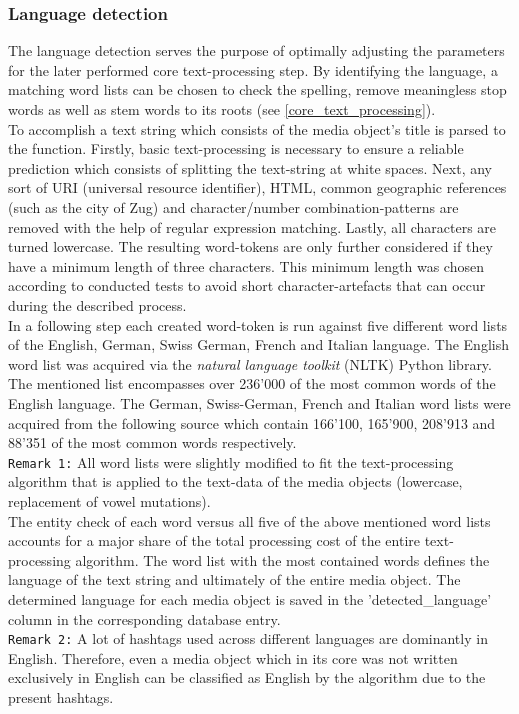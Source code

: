 \subsubsection*{Language detection} \label{language_detection}
The language detection serves the purpose of optimally adjusting the parameters for the later performed core text-processing step. By identifying the language, a matching word lists can be chosen to check the spelling, remove meaningless stop words as well as stem words to its roots (see \ref{core_text_processing}).\\
To accomplish a text string which consists of the media object's title is parsed to the function. Firstly, basic text-processing is necessary to ensure a reliable prediction which consists of splitting the text-string at white spaces. Next, any sort of URI (universal resource identifier), HTML, common geographic references (such as the city of Zug) and character/number combination-patterns are removed with the help of regular expression matching. Lastly, all characters are turned lowercase. The resulting word-tokens are only further considered if they have a minimum length of three characters. This minimum length was chosen according to conducted tests to avoid short character-artefacts that can occur during the described process.\\
In a following step each created word-token is run against five different word lists of the English, German, Swiss German, French and Italian language.
The English word list was acquired via the \textit{natural language toolkit} (NLTK) Python library. The mentioned list encompasses over 236'000 of the most common words of the English language.
The German, Swiss-German, French and Italian word lists were acquired from the following source \parencite{Geooffwicks} which contain 166'100, 165'900, 208'913 and 88'351 of the most common words respectively.\\
\newline
\texttt{Remark 1:} All word lists were slightly modified to fit the text-processing algorithm that is applied to the text-data of the media objects (lowercase, replacement of vowel mutations).\\
\newline
The entity check of each word versus all five of the above mentioned word lists accounts for a major share of the total processing cost of the entire text-processing algorithm. The word list with the most contained words defines the language of the text string and ultimately of the entire media object. The determined language for each media object is saved in the 'detected\_language' column in the corresponding database entry.\\
\newline
\texttt{Remark 2:} A lot of hashtags used across different languages are dominantly in English. Therefore, even a media object which in its core was not written exclusively in English can be classified as English by the algorithm due to the present hashtags.

